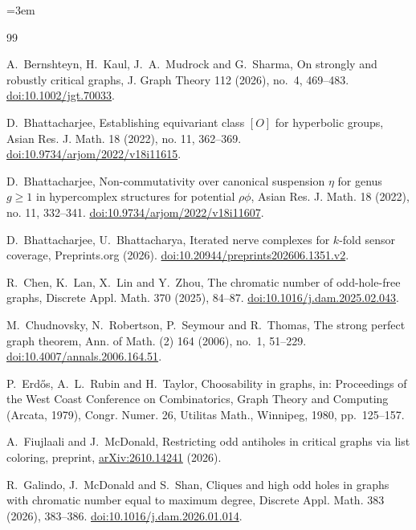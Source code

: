 \documentclass[11pt,a4paper,reqno]{amsart}
\theoremstyle{definition}
\theoremstyle{remark}
\begin{document}
\begingroup\sloppy\emergencystretch=3em
\begin{thebibliography}{99}

A.~Bernshteyn, H.~Kaul, J.~A.~Mudrock and G.~Sharma, On strongly and robustly critical graphs, J. Graph Theory 112 (2026), no.~4, 469--483. \href{https://doi.org/10.1002/jgt.70033}{doi:10.1002/jgt.70033}.

D.~Bhattacharjee, Establishing equivariant class $[O]$ for hyperbolic groups, Asian Res. J. Math. 18 (2022), no. 11, 362--369. \href{https://doi.org/10.9734/arjom/2022/v18i11615}{doi:10.9734/arjom/2022/v18i11615}.

D.~Bhattacharjee, Non-commutativity over canonical suspension $\eta$ for genus $g\ge1$ in hypercomplex structures for potential $\rho\phi$, Asian Res. J. Math. 18 (2022), no. 11, 332--341. \href{https://doi.org/10.9734/arjom/2022/v18i11607}{doi:10.9734/arjom/2022/v18i11607}.

D.~Bhattacharjee, U.~Bhattacharya, Iterated nerve complexes for $k$-fold sensor coverage, Preprints.org (2026). \href{https://doi.org/10.20944/preprints202606.1351.v2}{doi:10.20944/preprints202606.1351.v2}.

R.~Chen, K.~Lan, X.~Lin and Y.~Zhou, The chromatic number of odd-hole-free graphs, Discrete Appl. Math. 370 (2025), 84--87. \href{https://doi.org/10.1016/j.dam.2025.02.043}{doi:10.1016/j.dam.2025.02.043}.

M.~Chudnovsky, N.~Robertson, P.~Seymour and R.~Thomas, The strong perfect graph theorem, Ann. of Math. (2) 164 (2006), no.~1, 51--229. \href{https://doi.org/10.4007/annals.2006.164.51}{doi:10.4007/annals.2006.164.51}.

P.~Erd\H{o}s, A.~L.~Rubin and H.~Taylor, Choosability in graphs, in: Proceedings of the West Coast Conference on Combinatorics, Graph Theory and Computing (Arcata, 1979), Congr. Numer. 26, Utilitas Math., Winnipeg, 1980, pp.~125--157.

A.~Fiujlaali and J.~McDonald, Restricting odd antiholes in critical graphs via list coloring, preprint, \href{https://arxiv.org/abs/2610.14241}{arXiv:2610.14241} (2026).

R.~Galindo, J.~McDonald and S.~Shan, Cliques and high odd holes in graphs with chromatic number equal to maximum degree, Discrete Appl. Math. 383 (2026), 383--386. \href{https://doi.org/10.1016/j.dam.2026.01.014}{doi:10.1016/j.dam.2026.01.014}.


\end{thebibliography}
\end{document}
